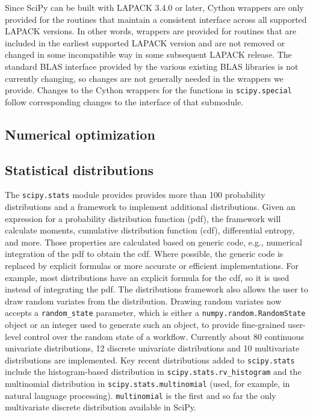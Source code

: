 \documentclass[fleqn,10pt]{wlscirep}
\begin{document}
Since SciPy can be built with LAPACK 3.4.0 or later, Cython wrappers are only provided for the routines that maintain a consistent interface across all supported LAPACK versions.
In other words, wrappers are provided for routines that are included in the earliest supported LAPACK version and are not removed or changed in some incompatible way in some subsequent LAPACK release.
The standard BLAS interface provided by the various existing BLAS libraries is not currently changing, so changes are not generally needed in the wrappers we provide.
Changes to the Cython wrappers for the functions in \texttt{scipy.{\allowbreak}special} follow corresponding changes to the interface of that submodule.

\subsection*{Numerical optimization}



\subsection*{Statistical distributions}
The \texttt{scipy.stats} module provides provides more than 100 probability
distributions and a framework to implement additional distributions. Given
an expression for a probability distribution function (pdf),
the framework will calculate moments, cumulative distribution function (cdf),
differential entropy, and more. Those properties are calculated based on
generic code, e.g., numerical integration of the pdf to obtain the cdf.
Where possible, the generic code is replaced by explicit formulas or more
accurate or efficient implementations. For example, most distributions have
an explicit formula for the cdf, so it is used instead of integrating the
pdf. The distributions framework also allows the user to draw random
variates from the distribution. Drawing random variates now accepts a \texttt{random\_state}
parameter, which is either a \texttt{numpy.random.RandomState} object or an
integer used to generate such an object, to provide fine-grained user-level
control over the random state of a workflow.
Currently about 80 continuous univariate distributions, 12 discrete univariate
distributions and 10 multivariate distributions are implemented.
Key recent distributions added to \texttt{scipy.stats} include the histogram-based
distribution in \texttt{scipy.stats.rv\_histogram} and the multinomial
distribution in \texttt{scipy.stats.multinomial} (used, for example, in natural
language processing\cite{Griffiths5228}). \texttt{multinomial} is the first and so 
far the only multivariate discrete distribution available in SciPy.
\end{document}
